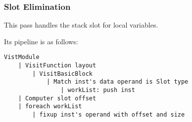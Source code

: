 \subsubsection{Slot Elimination}

This pass handles the stack slot for local variables.

Its pipeline is as follows:
\begin{lstlisting}[language={}]
VistModule
    | VisitFunction layout
        | VisitBasicBlock
            | Match inst's data operand is Slot type
                | workList: push inst 
    | Computer slot offset
    | foreach workList
        | fixup inst's operand with offset and size
\end{lstlisting}